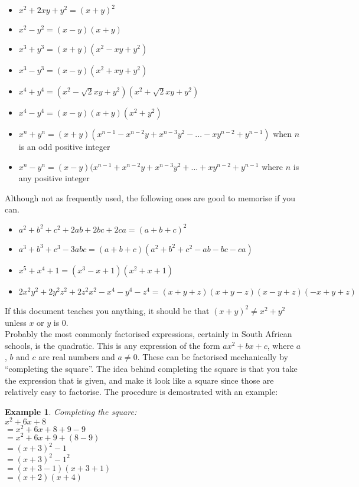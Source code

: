 \documentclass[a4paper,12pt]{article}
\newtheorem{example}{Example}[section]
\begin{document}
\begin{itemize}

\item $x^2 + 2xy + y^2 = (x + y) ^ 2$ 
\item $x^2 - y^2 = (x - y)(x + y)$
\item $x^3 + y^3 = (x + y)(x^2 - xy + y^2)$
\item $x^3 - y^3 = (x - y)(x^2 + xy + y^2)$
\item $x^4 + y^4 = (x^2 - \sqrt{2}xy + y^2)(x^2 + \sqrt{2}xy + y^2)$
\item $x^4 - y^4 = (x - y)(x + y)(x^2 + y^2)$
\item $x^n + y^n = (x + y)(x^{n - 1} - x^{n - 2}y + x^{n - 3}y^2 - ... - xy^{n - 2} + y^{n - 1})$ when $n$ is an odd positive integer
\item $x^n - y^n = (x - y)(x^{n - 1} + x^{n - 2}y + x^{n - 3}y^2 + ... + xy^{n - 2} + y^{n - 1}$ where $n$ is any positive integer

\end{itemize}

Although not as frequently used, the following ones are good to memorise if you can.

\begin{itemize}

\item $a^2 + b^2 + c^2 + 2ab + 2bc + 2ca = (a + b + c)^2$
\item $a^3 + b^3 + c^3 - 3abc = (a + b + c)(a^2 + b^2 + c^2 - ab - bc - ca)$
\item $x^5 + x^4 + 1 = (x^3 - x + 1)(x^2 + x + 1)$
\item $2x^2y^2 + 2y^2z^2 + 2z^2x^2 - x^4 - y^4 - z^4 = (x + y + z)(x + y - z)(x - y + z)(-x + y + z)$

\end{itemize}

If this document teaches you anything, it should be that $(x + y)^2 \neq x^2 + y^2$ unless $x$ or $y$ is 0.\\

Probably the most commonly factorised expressions, certainly in South African schools, is the quadratic. This is any expression of the form $ax^2 + bx + c$, where $a$, $b$ and $c$ are real numbers and $a \neq 0$. These can be factorised mechanically by ``completing the square''.  The idea behind completing the square is that you take the expression that is given, and make it look like a square since those are relatively easy to factorise. The procedure is demostrated with an example: \\
\begin{example}
Completing the square:\\
    $x^2 + 6x + 8$ \\ 
    $= x^2 + 6x + 8 + 9 - 9$ \\ 
    $= x^2 + 6x + 9 + (8 - 9)$ \\
    $= (x + 3)^2 - 1$ \\
    $= (x + 3)^2 - 1^2$ \\
    $= (x + 3 - 1)(x + 3 + 1)$ \\ 
    $= (x + 2)(x + 4)$ \\
\end{example}
\end{document}
